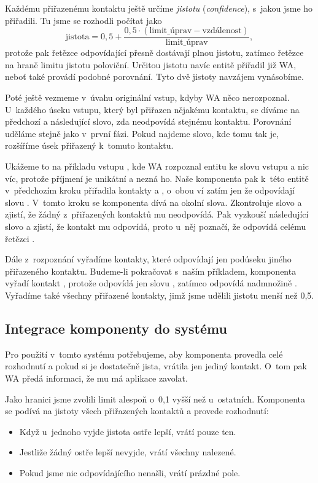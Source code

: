 Každému přiřazenému kontaktu ještě určíme \textit{jistotu} (\textit{confidence}),
s~jakou jsme ho přiřadili. Tu jsme se rozhodli počítat jako
\[ \text{jistota} = 0,5 + \frac{0,5 \cdot (\text{limit\_úprav} - \text{vzdálenost})}{\text{limit\_úprav}} ,\]
protože pak řetězce odpovídající přesně dostávají plnou jistotu, zatímco řetězce na
hraně limitu jistotu poloviční. Určitou jistotu navíc entitě přiřadil již WA,
neboť také provádí podobné porovnání. Tyto dvě jistoty navzájem vynásobíme.

Poté ještě vezmeme v~úvahu originální vstup, kdyby WA něco nerozpoznal. U~každého
úseku vstupu, který byl přiřazen nějakému kontaktu, se díváme na předchozí a následující
slovo, zda neodpovídá stejnému kontaktu. Porovnání uděláme stejně jako v~první fázi.
Pokud najdeme slovo, kde tomu tak je, rozšíříme úsek přiřazený k~tomuto kontaktu.

Ukážeme
to na příkladu vstupu , kde WA rozpoznal entitu 
ke slovu vstupu  a nic víc, protože příjmení je unikátní a nezná ho.
Naše komponenta pak k~této entitě v~předchozím kroku přiřadila
kontakty  a , o~obou ví zatím jen že odpovídají slovu .
V~tomto kroku se komponenta dívá na okolní slova.
Zkontroluje slovo  a zjistí, že žádný z~přiřazených kontaktů mu neodpovídá. Pak
vyzkouší následující slovo  a zjistí, že kontakt  mu odpovídá,
proto u~něj poznačí, že odpovídá celému řetězci .

Dále z~rozpoznání vyřadíme kontakty, které odpovídají jen podúseku jiného
přiřazeného kontaktu. Budeme-li pokračovat s~naším příkladem, komponenta vyřadí kontakt ,
protože odpovídá jen slovu , zatímco  odpovídá nadmnožině .
Vyřadíme také
všechny přiřazené kontakty, jimž jsme udělili jistotu menší než 0,5.

\subsection{Integrace komponenty do systému}\label{integration}

Pro použití v~tomto systému potřebujeme, aby komponenta provedla
celé rozhodnutí a pokud si je dostatečně jista, vrátila jen jediný kontakt.
O~tom pak WA předá informaci, že mu má aplikace zavolat.

Jako hranici  jsme zvolili limit alespoň o~0,1 vyšší než u~ostatních.
Komponenta se podívá na jistoty všech přiřazených kontaktů a provede rozhodnutí:
\begin{itemize}
    \item Když u~jednoho vyjde jistota ostře lepší, vrátí pouze ten.
    \item Jestliže žádný ostře lepší nevyjde, vrátí všechny nalezené.
    \item Pokud jsme nic odpovídajícího nenašli, vrátí prázdné pole.
\end{itemize}